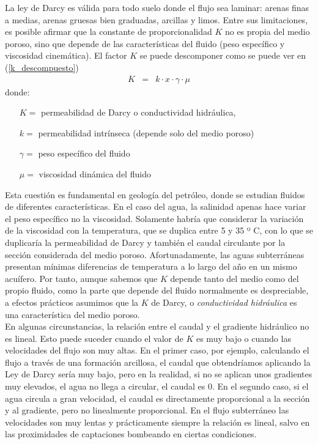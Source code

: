 \documentclass[10pt,a4paper,final]{article}
\begin{document}
%
La ley de Darcy es válida para todo suelo donde el flujo sea laminar: arenas finas a medias, arenas gruesas bien graduadas, arcillas y limos. Entre sus limitaciones, es posible afirmar que la constante de proporcionalidad $K$ no es propia del medio poroso, sino que depende de las características del fluido (peso específico y viscosidad cinemática). 
El factor $K$ se puede descomponer como se puede ver en (\ref{k_descompuesto}) 
\begin{eqnarray}
	K&=& k \cdot x \cdot \gamma \cdot \mu \label{k_descompuesto}
\end{eqnarray}
donde: 
\begin{itemize}
	\item[$K=$] permeabilidad de Darcy o conductividad hidráulica,
	\item[$k=$] permeabilidad intrínseca (depende solo del medio poroso)
	\item[$\gamma=$] peso específico del fluido
	\item[$\mu=$] viscosidad dinámica del fluido
\end{itemize}
Esta cuestión es fundamental en geología del petróleo, donde se estudian fluidos de diferentes características. En el caso del agua, la salinidad apenas hace variar el peso específico no la viscosidad.
Solamente habría que considerar la variación de la viscosidad con la temperatura, que se duplica entre 5 y 35 º C, con lo que se duplicaría la permeabilidad de Darcy y también el caudal circulante por la sección considerada del medio poroso. Afortunadamente, las aguas subterráneas presentan mínimas diferencias de temperatura a lo largo del año en un mismo acuífero.
Por tanto, aunque sabemos que $K$ depende tanto del medio como del propio fluido, como la parte que depende del fluido normalmente es despreciable, a efectos prácticos asumimos que la $K$ de Darcy, o \emph{conductividad hidráulica} es una característica del medio poroso.
\\
En algunas circunstancias, la relación entre el caudal y el gradiente hidráulico no es lineal.
Esto puede suceder cuando el valor de $K$ es muy bajo o cuando las velocidades del flujo son muy altas.
En el primer caso, por ejemplo, calculando el flujo a través de una formación arcillosa, el caudal que obtendríamos aplicando la Ley de Darcy sería muy bajo, pero en la realidad, si no se aplican unos gradientes muy elevados, el agua no llega a circular, el caudal es 0.
En el segundo caso, si el agua circula a gran velocidad, el caudal es directamente proporcional a la sección y al gradiente, pero no linealmente proporcional.
En el flujo subterráneo las velocidades son muy lentas y prácticamente siempre la relación es lineal, salvo en las proximidades de captaciones bombeando en ciertas condiciones.
\end{document}
